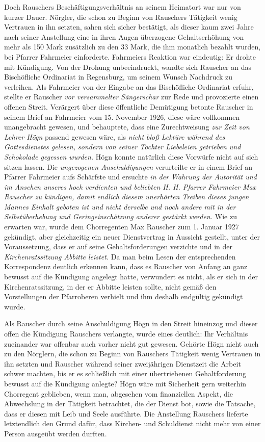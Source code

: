 \documentclass{book}
\newcommand{\zitat}[1]{\textit{#1}}
\begin{document}
Doch Rauschers Beschäftigungsverhältnis an seinem Heimatort war nur von
kurzer Dauer. Nörgler, die schon zu Beginn von Rauschers Tätigkeit
wenig Vertrauen in ihn setzten, sahen sich sicher bestätigt, als
dieser kaum zwei Jahre nach seiner Anstellung eine in ihren Augen
überzogene Gehaltserhöhung von mehr als 150 Mark zusätzlich zu den 33
Mark, die ihm monatlich bezahlt wurden, bei Pfarrer Fahrmeier
einforderte. Fahrmeiers Reaktion war eindeutig: Er drohte mit
Kündigung. Von der Drohung unbeeindruckt, wandte sich Rauscher an das
Bischöfliche Ordinariat in Regensburg, um seinem Wunsch Nachdruck zu
verleihen. Als Fahrmeier von der Eingabe an das Bischöfliche Ordinariat
erfuhr, stellte er Rauscher \zitat{vor versammelter
Sängerschar} zur Rede und provozierte einen offenen Streit. Verärgert
über diese öffentliche Demütigung betonte Rauscher in seinem Brief an
Fahrmeier vom 15. November 1926, diese wäre vollkommen unangebracht
gewesen, und behauptete, dass eine Zurechtweisung \zitat{zur
Zeit von Lehrer Högn} passend gewesen wäre, als \zitat{nicht
bloß Lektüre während des Gottesdienstes gelesen, sondern von seiner
Tochter Liebeleien getrieben und Schokolade gegessen wurden.} Högn
konnte natürlich diese Vorwürfe nicht auf sich sitzen lassen. Die
\zitat{ungezogenen Anschuldigungen} verurteilte er in einem
Brief an Pfarrer Fahrmeier aufs Schärfste und ersuchte
\zitat{in der Wahrung der Autorität und im Ansehen unseres
hoch verdienten und beliebten H. H. Pfarrer Fahrmeier Max Rauscher zu
kündigen, damit endlich diesem unerhörten Treiben dieses jungen Mannes
Einhalt geboten ist und nicht derselbe und noch andere mit in der
Selbstüberhebung und Geringeinschätzung anderer gestärkt werden.} Wie
zu erwarten war, wurde dem Chorregenten Max Rauscher zum 1. Januar 1927
gekündigt, aber gleichzeitig ein neuer Dienstvertrag in Aussicht
gestellt, unter der Voraussetzung, dass er auf seine Gehaltsforderungen
verzichte und in der \zitat{Kirchenratssitzung Abbitte
leistet.} Da man beim Lesen der entsprechenden Korrespondenz deutlich
erkennen kann, dass es Rauscher von Anfang an ganz bewusst auf die
Kündigung angelegt hatte, verwundert es nicht, als er sich in der
Kirchenratssitzung, in der er Abbitte leisten sollte, nicht gemäß den
Vorstellungen der Pfarroberen verhielt und ihm deshalb endgültig
gekündigt wurde.

Als Rauscher durch seine Anschuldigung Högn in den Streit hineinzog und
dieser offen die Kündigung Rauschers verlangte, wurde eines deutlich:
Ihr Verhältnis zueinander war offenbar auch vorher nicht gut gewesen.
Gehörte Högn nicht auch zu den Nörglern, die schon zu Beginn von
Rauschers Tätigkeit wenig Vertrauen in ihn setzten und Rauscher
während seiner zweijährigen Dienstzeit die Arbeit schwer machten, bis
er es schließlich mit einer übertriebenen Gehaltforderung bewusst auf
die Kündigung anlegte? Högn wäre mit Sicherheit gern weiterhin
Chorregent geblieben, wenn man, abgesehen vom finanziellen Aspekt, die
Abwechslung in der Tätigkeit betrachtet, die der Dienst bot, sowie die
Tatsache, dass er diesen mit Leib und Seele ausführte. Die Anstellung
Rauschers lieferte letztendlich den Grund dafür, dass Kirchen- und
Schuldienst nicht mehr von einer Person ausgeübt werden durften.
\end{document}
